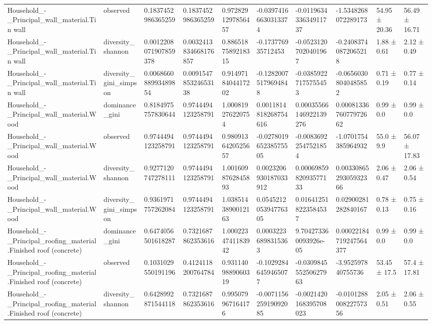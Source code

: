 \begin{longtable}{llllllllll}
Household\_-\_Principal\_wall\_material.Tin wall & observed & 0.1837452986365259 & 0.1837452986365259 & 0.9728291297856457 & -0.03974166630313374 & -0.011963433634911737 & -1.5348268072289173 & 54.95 ± 20.36 & 56.49 ± 16.71 \\
Household\_-\_Principal\_wall\_material.Tin wall & diversity\_shannon & 0.0012208071907859378 & 0.0032413834668176857 & 0.8865187589218315 & -0.173776935712453 & -0.05231207020401967 & -0.24083740872065218 & 1.88 ± 0.61 & 2.12 ± 0.49 \\
Household\_-\_Principal\_wall\_material.Tin wall & diversity\_gini\_simpson & 0.006866088993489854 & 0.009154785324653138 & 0.9149718404417202 & -0.12820075179694848 & -0.03859227175755453 & -0.06560308040485852 & 0.71 ± 0.19 & 0.77 ± 0.14 \\
Household\_-\_Principal\_wall\_material.Wood & dominance\_gini & 0.8184975757830644 & 0.9744494123258791 & 1.000819276220754 & 0.0011814818268754616 & 0.00035566146922139276 & 0.0008133676077972662 & 0.99 ± 0.0 & 0.99 ± 0.0 \\
Household\_-\_Principal\_wall\_material.Wood & observed & 0.9744494123258791 & 0.9744494123258791 & 0.9809136420525657 & -0.027801965238575505 & -0.00836922547521854 & -1.0701754385964932 & 55.0 ± 9.9 & 56.07 ± 17.83 \\
Household\_-\_Principal\_wall\_material.Wood & diversity\_shannon & 0.9277120747278111 & 0.9744494123258791 & 1.0016098762845893 & 0.0023206930187033912 & 0.0006985982093577133 & 0.0033086529305932366 & 2.06 ± 0.47 & 2.06 ± 0.54 \\
Household\_-\_Principal\_wall\_material.Wood & diversity\_gini\_simpson & 0.9361971757262084 & 0.9744494123258791 & 1.0385143890012163 & 0.054521205394776305 & 0.016412518223584537 & 0.02900281282840167 & 0.78 ± 0.13 & 0.75 ± 0.16 \\
Household\_-\_Principal\_roofing\_material.Finished roof (concrete) & dominance\_gini & 0.6474056501618287 & 0.7321687862353616 & 1.0002234741183942 & 0.00032236898315363 & 9.704273360093926e-05 & 0.00022184719247564377 & 0.99 ± 0.0 & 0.99 ± 0.0 \\
Household\_-\_Principal\_roofing\_material.Finished roof (concrete) & observed & 0.1031029550191196 & 0.4124118200764784 & 0.9311409889060319 & -0.10292846459465077 & -0.030984555250627963 & -3.952597840755736 & 53.45 ± 17.5 & 57.4 ± 17.81 \\
Household\_-\_Principal\_roofing\_material.Finished roof (concrete) & diversity\_shannon & 0.6428992871544118 & 0.7321687862353616 & 0.995079967164176 & -0.007115625919092085 & -0.0021420168395708023 & -0.010128800822757356 & 2.05 ± 0.51 & 2.06 ± 0.55 \\

\end{longtable}
